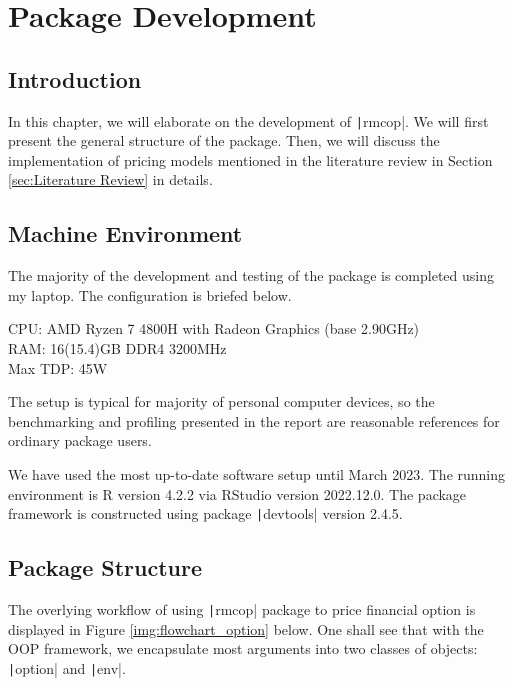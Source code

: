 \chapter{Package Development} \label{cpt:Pkg Dev}

\section{Introduction}

In this chapter, we will elaborate on the development of \texttt|rmcop|. We will first present the general structure of the package. Then, we will discuss the implementation of pricing models mentioned in the literature review in Section \ref{sec:Literature Review} in details.

\section{Machine Environment} \label{sec:machine_env}

The majority of the development and testing of the package is completed using my laptop. The configuration is briefed below.

\begin{listing}[H]
CPU: AMD Ryzen 7 4800H with Radeon Graphics (base 2.90GHz) \\
RAM: 16(15.4)GB DDR4 3200MHz \\
Max TDP: 45W
\end{listing}

The setup is typical for majority of personal computer devices, so the benchmarking and profiling presented in the report are reasonable references for ordinary package users.

We have used the most up-to-date software setup until March 2023. The running environment is R version 4.2.2 via RStudio version 2022.12.0. The package framework is constructed using package \texttt|devtools| version 2.4.5.

\section{Package Structure} \label{sec:Pkg Structure}

The overlying workflow of using \texttt|rmcop| package to price financial option is displayed in Figure \ref{img:flowchart_option} below. One shall see that with the OOP framework, we encapsulate most arguments into two classes of objects: \texttt|option| and \texttt|env|.

